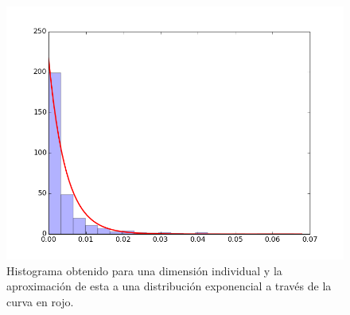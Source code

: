 \begin{itemize}
		\begin{figure}[htbp]
			\centering
			\centerline{ \includegraphics[scale=0.50]{img/histograma-curva.png} }
			\caption[Histograma con curva exponencial]{Histograma obtenido para una dimensión individual y la aproximación de esta a una distribución exponencial a través de la curva en rojo.}
			\label{fig: exponential-fit}
		\end{figure}
		
	
	\end{itemize}